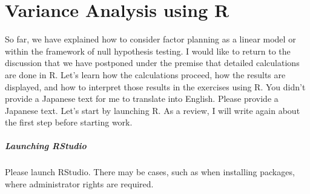 \documentclass{ltjbook}
\begin{document}
\chapter{Variance Analysis using R}
\label{m22_anovaOnR}
So far, we have explained how to consider factor planning as a linear model or within the framework of null hypothesis testing.
I would like to return to the discussion that we have postponed under the premise that detailed calculations are done in R. Let's learn how the calculations proceed, how the results are displayed, and how to interpret those results in the exercises using R.
You didn't provide a Japanese text for me to translate into English. Please provide a Japanese text.
Let's start by launching R. As a review, I will write again about the first step before starting work.
\paragraph{Launching RStudio} Please launch RStudio. There may be cases, such as when installing packages, where administrator rights are required.
\end{document}
